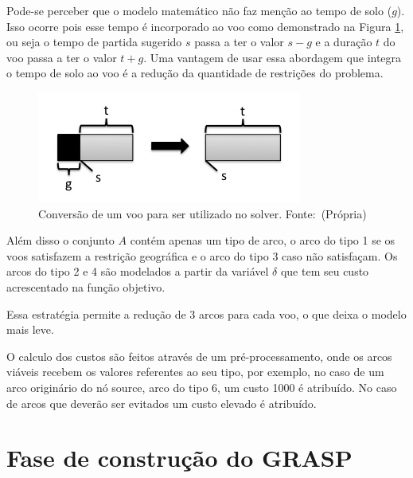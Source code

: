 \clearpage

Pode-se perceber que o modelo matemático não faz menção ao tempo de solo ($g$).
Isso ocorre pois esse tempo é incorporado ao voo como demonstrado na Figura
\ref{fig:conversion}, ou seja o tempo de partida sugerido $s$ passa a ter o
valor $s - g$ e a duração $t$ do voo passa a ter o valor $t + g$. Uma vantagem
de usar essa abordagem que integra o tempo de solo ao voo é a redução da
quantidade de restrições do problema.

\begin{figure}[ht]
	\caption{Conversão de um voo para ser utilizado no
	solver. \mbox{Fonte: (Própria)}}\label{fig:conversion}
	\includegraphics[scale=0.4]{./img/conversion}
	
\end{figure}

Além disso o conjunto $A$ contém apenas um tipo de arco, o arco do tipo 1 se os
voos satisfazem a restrição geográfica e o arco do tipo 3 caso não satisfaçam.
Os arcos do tipo 2 e 4 são modelados a partir  da variável $\delta$ que tem seu
custo acrescentado na função objetivo.

Essa estratégia permite a redução de 3 arcos para cada voo, o que deixa o
modelo mais leve.

O calculo dos custos são feitos através de um pré-processamento, onde os arcos
viáveis recebem os valores referentes ao seu tipo, por exemplo, no caso de um
arco originário do nó source, arco do tipo 6, um custo 1000 é atribuído. No
caso de arcos que deverão ser evitados um custo elevado é atribuído.
  	
  	

  
\section{Fase de construção do GRASP}
  
